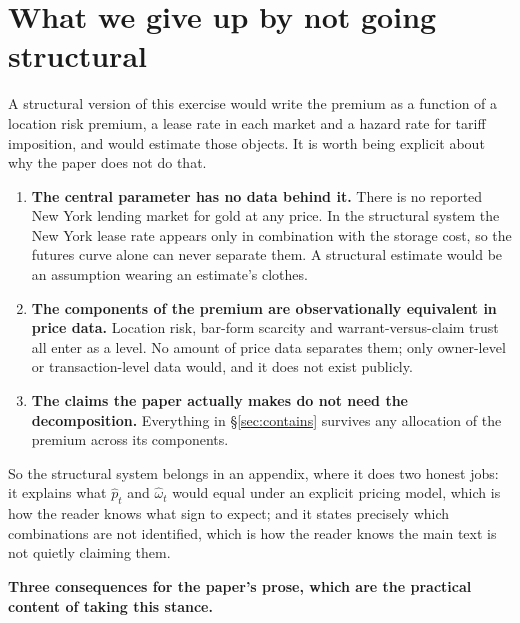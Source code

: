 \documentclass[11pt,a4paper]{article}
\newcommand{\phat}{\widehat{p}_t}
\newcommand{\omhat}{\widehat{\omega}_t}
\begin{document}
\section{What we give up by not going structural}
\label{sec:stance}

A structural version of this exercise would write the premium as a function of
a location risk premium, a lease rate in each market and a hazard rate for
tariff imposition, and would estimate those objects. It is worth being explicit
about why the paper does not do that.

\begin{enumerate}[leftmargin=1.4em,itemsep=3pt,topsep=2pt]
\item \textbf{The central parameter has no data behind it.} There is no
reported New York lending market for gold at any price. In the structural
system the New York lease rate appears only in combination with the storage
cost, so the futures curve alone can never separate them. A structural estimate
would be an assumption wearing an estimate's clothes.
\item \textbf{The components of the premium are observationally equivalent in
price data.} Location risk, bar-form scarcity and warrant-versus-claim trust all
enter as a level. No amount of price data separates them; only owner-level or
transaction-level data would, and it does not exist publicly.
\item \textbf{The claims the paper actually makes do not need the
decomposition.} Everything in \S\ref{sec:contains} survives any allocation of
the premium across its components.
\end{enumerate}

So the structural system belongs in an appendix, where it does two honest jobs:
it explains what $\phat$ and $\omhat$ would equal under an explicit pricing
model, which is how the reader knows what sign to expect; and it states
precisely which combinations are not identified, which is how the reader knows
the main text is not quietly claiming them.

\medskip
\noindent\textbf{Three consequences for the paper's prose, which are the
practical content of taking this stance.}
\end{document}
